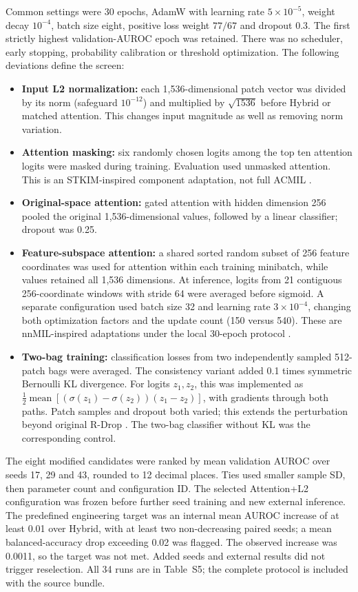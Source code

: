 Common settings were 30 epochs, AdamW with learning rate $5\times10^{-5}$, weight decay $10^{-4}$, batch size eight, positive loss weight $77/67$ and dropout 0.3. The first strictly highest validation-AUROC epoch was retained. There was no scheduler, early stopping, probability calibration or threshold optimization. The following deviations define the screen:
\begin{itemize}
\item \textbf{Input L2 normalization:} each 1,536-dimensional patch vector was divided by its norm (safeguard $10^{-12}$) and multiplied by $\sqrt{1536}$ before Hybrid or matched attention. This changes input magnitude as well as removing norm variation.
\item \textbf{Attention masking:} six randomly chosen logits among the top ten attention logits were masked during training. Evaluation used unmasked attention. This is an STKIM-inspired component adaptation, not full ACMIL \citep{acmil2024}.
\item \textbf{Original-space attention:} gated attention with hidden dimension 256 pooled the original 1,536-dimensional values, followed by a linear classifier; dropout was 0.25.
\item \textbf{Feature-subspace attention:} a shared sorted random subset of 256 feature coordinates was used for attention within each training minibatch, while values retained all 1,536 dimensions. At inference, logits from 21 contiguous 256-coordinate windows with stride 64 were averaged before sigmoid. A separate configuration used batch size 32 and learning rate $3\times10^{-4}$, changing both optimization factors and the update count (150 versus 540). These are nnMIL-inspired adaptations under the local 30-epoch protocol \citep{nnmil2026}.
\item \textbf{Two-bag training:} classification losses from two independently sampled 512-patch bags were averaged. The consistency variant added 0.1 times symmetric Bernoulli KL divergence. For logits $z_1,z_2$, this was implemented as $\tfrac12\operatorname{mean}[(\sigma(z_1)-\sigma(z_2))(z_1-z_2)]$, with gradients through both paths. Patch samples and dropout both varied; this extends the perturbation beyond original R-Drop \citep{rdrop2021}. The two-bag classifier without KL was the corresponding control.
\end{itemize}

The eight modified candidates were ranked by mean validation AUROC over seeds 17, 29 and 43, rounded to 12 decimal places. Ties used smaller sample SD, then parameter count and configuration ID. The selected Attention+L2 configuration was frozen before further seed training and new external inference. The predefined engineering target was an internal mean AUROC increase of at least 0.01 over Hybrid, with at least two non-decreasing paired seeds; a mean balanced-accuracy drop exceeding 0.02 was flagged. The observed increase was 0.0011, so the target was not met. Added seeds and external results did not trigger reselection. All 34 runs are in Table~S5; the complete protocol is included with the source bundle.

